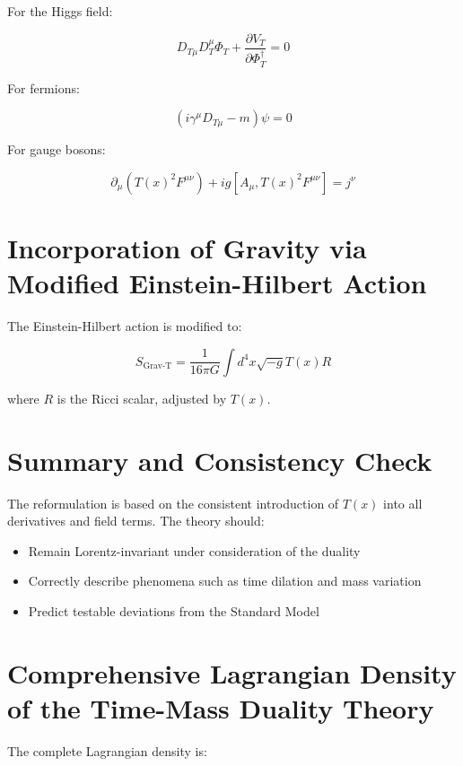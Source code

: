 \documentclass{article}
\begin{document}
	For the Higgs field:
	
	\begin{equation}
		D_{T\mu} D_T^\mu \Phi_T + \frac{\partial V_T}{\partial \Phi_T^\dagger} = 0
	\end{equation}
	
	For fermions:
	
	\begin{equation}
		(i \gamma^\mu D_{T\mu} - m) \psi = 0
	\end{equation}
	
	For gauge bosons:
	
	\begin{equation}
		\partial_\mu (T(x)^2 F^{\mu\nu}) + i g [A_\mu, T(x)^2 F^{\mu\nu}] = j^\nu
	\end{equation}
	
	\section{Incorporation of Gravity via Modified Einstein-Hilbert Action}
	The Einstein-Hilbert action is modified to:
	
	\begin{equation}
		S_{\text{Grav-T}} = \frac{1}{16\pi G} \int d^4x \sqrt{-g} T(x) R
	\end{equation}
	
	where \( R \) is the Ricci scalar, adjusted by \( T(x) \).
	
	\section{Summary and Consistency Check}
	The reformulation is based on the consistent introduction of \( T(x) \) into all derivatives and field terms. The theory should:
	
	\begin{itemize}
		\item Remain Lorentz-invariant under consideration of the duality
		\item Correctly describe phenomena such as time dilation and mass variation
		\item Predict testable deviations from the Standard Model
	\end{itemize}
	
	\section{Comprehensive Lagrangian Density of the Time-Mass Duality Theory}
	The complete Lagrangian density is:
	
\end{document}
